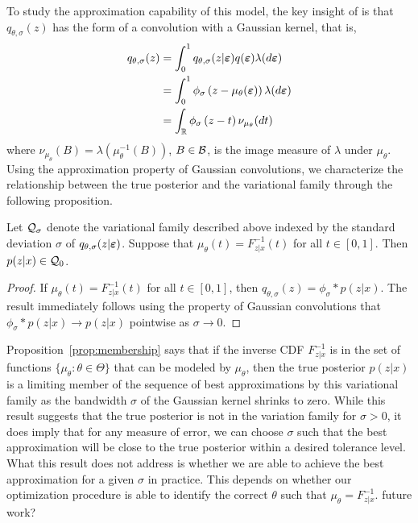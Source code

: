 \documentclass[10pt]{article}
\begin{document}
To study the approximation capability of this model, the key insight of \citet{Plummer:2021} is that $q_{\theta,\sigma}(z)$ has the form of a convolution with a Gaussian kernel, that is,
\begin{align*}
q_{\theta,\sigma}(z) &= \int_0^1 q_{\theta,\sigma}(z|\bm{\varepsilon})q(\bm{\varepsilon})\lambda(d\bm{\varepsilon}) \\
&= \int_0^1 \phi_\sigma\left(z-\mu_\theta(\bm{\varepsilon})\right)\lambda(d\bm{\varepsilon}) \\
&= \int_{\mathbb{R}} \phi_\sigma\left(z-t\right)\nu_{\mu_\theta}(dt)
\end{align*}
where $\nu_{\mu_\theta}(B)=\lambda\left(\mu_\theta^{-1}(B)\right)$, $B\in\mathcal{B}$, is the image measure of $\lambda$ under $\mu_\theta$. Using the approximation property of Gaussian convolutions, we characterize the relationship between the true posterior and the variational family through the following proposition.

\begin{proposition} \label{prop:membership}
Let $\mathcal{Q}_\sigma$ denote the variational family described above indexed by the standard deviation $\sigma$ of $q_{\theta,\sigma}(z|\bm{\varepsilon})$. Suppose that $\mu_\theta(t)=F_{z|x}^{-1}(t)$ for all $t\in[0,1]$. Then $p(z|x)\in\mathcal{Q}_0$.
\end{proposition}
\begin{proof}
If $\mu_\theta(t)=F_{z|x}^{-1}(t)$ for all $t\in[0,1]$, then $q_{\theta,\sigma}(z) = \phi_\sigma*p(z|x)$. The result immediately follows using the property of Gaussian convolutions that $\phi_\sigma*p(z|x)\rightarrow p(z|x)$ pointwise as $\sigma\rightarrow0$.
\end{proof}

Proposition~\ref{prop:membership} says that if the inverse CDF $F_{z|x}^{-1}$ is in the set of functions $\{\mu_\theta:\theta\in\Theta\}$ that can be modeled by $\mu_\theta$, then the true posterior $p(z|x)$ is a limiting member of the sequence of best approximations by this variational family as the bandwidth $\sigma$ of the Gaussian kernel shrinks to zero. While this result suggests that the true posterior is not in the variation family for $\sigma>0$, it does imply that for any measure of error, we can choose $\sigma$ such that the best approximation will be close to the true posterior within a desired tolerance level. What this result does not address is whether we are able to achieve the best approximation for a given $\sigma$ in practice. This depends on whether our optimization procedure is able to identify the correct $\theta$ such that $\mu_\theta=F_{z|x}^{-1}$. \todo future work?
\\
\end{document}
